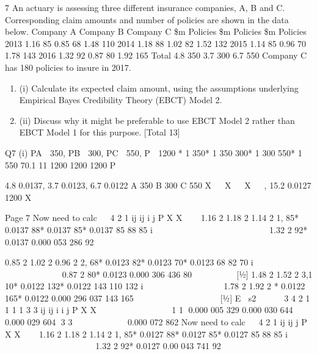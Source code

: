\documentclass[a4paper,12pt]{article}
\begin{document}
\begin{enumerate}
7 An actuary is assessing three different insurance companies, A, B and C.
Corresponding claim amounts and number of policies are shown in the data below.
Company A Company B Company C
\$m Policies
\$m Policies \$m Policies
2013 1.16 85 0.85 68 1.48 110
2014 1.18 88 1.02 82 1.52 132
2015 1.14 85 0.96 70 1.78 143
2016 1.32 92 0.87 80 1.92 165
Total 4.8 350 3.7 300 6.7 550
Company C has 180 policies to insure in 2017.
\begin{enumerate}
    \item (i) Calculate its expected claim amount, using the assumptions underlying
Empirical Bayes Credibility Theory (EBCT) Model 2. 
\item (ii) Discuss why it might be preferable to use EBCT Model 2 rather than EBCT
Model 1 for this purpose. 
[Total 13]
\end{enumerate}


\newpage

Q7 (i) PA  350, PB  300, PC  550, P  1200
* 1 350* 1 350 300* 1 300 550* 1 550 70.1
11 1200 1200 1200
P
                           

4.8 0.0137, 3.7 0.0123, 6.7 0.0122
A 350 B 300 C 550 X   X   X   , 15.2 0.0127
1200
X  

Page 7
Now need to calc   4 2
1
ij ij i
j
P X X

 
1.16 2 1.18 2 1.14 2 1, 85* 0.0137 88* 0.0137 85* 0.0137
85 88 85
i             
     
1.32 2 92* 0.0137 0.000 053 286
92
     
 

0.85 2 1.02 2 0.96 2 2, 68* 0.0123 82* 0.0123 70* 0.0123
68 82 70
i             
     
0.87 2 80* 0.0123 0.000 306 436
80
     
 
[½]
1.48 2 1.52 2 3,1 10* 0.0122 132* 0.0122 143
110 132
i         
   
1.78 2 1.92 2 * 0.0122 165* 0.0122 0.000 296 037
143 165
           
   
[½]
E s2    3 4 2
1 1
1 1
3 3 ij ij i
i j
P X X
 
     
 
 
1 1 0.000 005 329 0.000 030 644 0.000 029 604
3 3
      
 
 0.000 072 862 
Now need to calc   4 2
1
ij ij
j
P X X

 
1.16 2 1.18 2 1.14 2 1, 85* 0.0127 88* 0.0127 85* 0.0127
85 88 85
i            
     
1.32 2 92* 0.0127 0.00 043 741
92
      
 


\end{enumerate}
\end{document}
